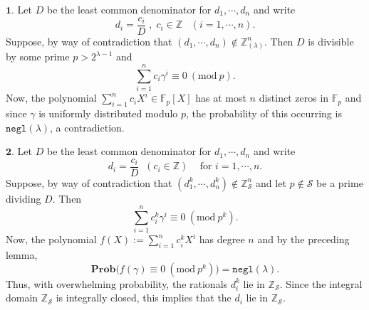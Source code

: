 \documentclass[11pt, lettersize, notitlepage, leqno, footskip=0.6cm]{article}
\newcommand{\bz}{\mathbb Z}
\newcommand{\bq}{\mathbb Q}
\newcommand{\bFp}{\mathbb{F}_p}
\newcommand{\slim}{\sum\limits}
\newcommand{\ttt}{\texttt}
\newcommand{\negl}{\ttt{{negl}}}
\newcommand{\mc}{\mathcal}
\newcommand{\mbf}{\mathbf}
\newcommand{\lam}{\lambda}
\newcommand{\lamb}{\lambda}
\newcommand{\bzlam}{\bz_{(\lam)}}
\newcommand{\vs}{\vspace{-0.15cm}}
\newcommand{\noin}{\noindent}
\newcommand{\op}{overwhelming probability}
\newcommand{\Mod}[1]{\ (\mathrm{mod}\ #1)}
\numberwithin{equation}{section}
\begin{document}
\begin{prf} $\mbf{1}$. Let $D$ be the least common denominator for $d_1,\cdots, d_n$ and write \vs $$d_i = \frac{c_i}{D}\;,\; c_i\in\bz\; \;\;(i=1,\cdots, n).$$ Suppose, by way of contradiction that $(d_1,\cdots, d_n )\notin \bzlam^n$. Then $D$ is divisible by some prime $p>2^{\lam-1}$ and \vs $$\sum\limits_{i=1}^n  {c_i\gamma^i} \equiv 0\Mod{p}.$$ Now, the polynomial $\sum\limits_{i=1}^n c_iX^i \in \bFp[X]$ has at most $n$ distinct zeros in $\bFp$ and since $\gamma$ is uniformly distributed modulo $p$, the probability of this occurring is $\negl(\lamb)$, a contradiction.\vspace{0.15cm} 

\noin $\mbf{2}$. Let $D$ be the least common denominator for $d_1,\cdots, d_n$ and write \vs $$d_i = \frac{c_i}{D}\;\; (c_i\in \bz)\;\;\; \text{ for } i=1,\cdots, n.$$ Suppose, by way of contradiction that $(d_1^{k},\cdots, d_n^{k} )\notin \bz_{\mc{S}}^n$ and let $p\notin \mc{S}$ be a prime dividing $D$. Then \vs $$\slim_{i=1}^n c_i^{k}\gamma^i \equiv 0\Mod{p^{k}}.$$ Now, the polynomial $f(X):= \slim_{i=1}^n c_i^{k} X^i$ has degree $n$ and by the preceding lemma, \vs $$\mbf{Prob}\big(f(\gamma)\equiv 0\Mod{p^{k}} \big) = \negl(\lam).$$ Thus, with \op, the rationals $d_i^{k}$ lie in $\bz_{\mc{S}}$. Since the integral domain $\bz_{\mc{S}}$ is integrally closed, this implies that the $d_i$ lie in $\bz_{\mc{S}}$.\end{prf}

\begin{comment} 


\noin $\mbf{2}$. For rationals $d_1,\cdots, d_n\in \bq$ and a randomly generated $\lam$-bit integer $\gamma$, if \vs $$\slim_{i=1}^n d_i^{n\lam}\gamma^i\; \in \;\bz,$$ with \op, $(d_1,\cdots, d_n)\in \bz^n$.



\noin $\mbf{2}$. Let $D$ be the least common denominator for $d_1,\cdots, d_n$ and write $d_i = \frac{c_i}{D}$ for $i=1,\cdots, n.$ Suppose, by way of contradiction that $(d_1^{n\lam},\cdots, d_n^{n\lam} )\notin \bz^n$ and let $p$ be a prime dividing $D$. Then $$\slim_{i=1}^n c_i^{n\lam}\gamma^i \equiv 0\Mod{p^{n\lam}}.$$ Now, the polynomial $f(X):= \slim_{i=1}^n c_i^{n\lam} X^i$ has degree $n$ and by the preceding lemma, \vs $$\mbf{Prob}\big(h(\gamma)\equiv 0\Mod{p^{n\lam}} \big) = \negl(\lam).$$ Thus, with \op, the rationals $d_i^{n\lam}$ are integers, which in turn implies that the $d_i$ are integers. \end{comment}
\end{document}
